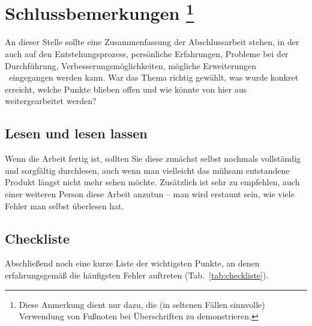 \chapter[Schlussbemerkungen]%
        {Schlussbemerkungen%
        \protect\footnote{Diese Anmerkung dient nur dazu, die (in seltenen Fällen sinnvolle)
				Verwendung von Fußnoten bei Überschriften zu demonstrieren.}}%
\label{cha:Schluss}

An dieser Stelle sollte eine Zusammenfassung der Abschlussarbeit
stehen, in der auch auf den Entstehungsprozess, persönliche
Erfahrungen, Probleme bei der Durchführung,
Verbesserungsmöglichkeiten, mögliche %
Erweiterungen \usw\ eingegangen werden kann. War das Thema richtig
gewählt, was wurde konkret erreicht, welche Punkte blieben offen
und wie könnte von hier aus weitergearbeitet werden?


\section{Lesen und lesen lassen}

Wenn die Arbeit fertig ist, sollten Sie diese zunächst selbst nochmals vollständig und sorgfältig durchlesen, auch wenn man vielleicht das mühsam entstandene Produkt längst nicht mehr sehen möchte. Zusätzlich ist sehr zu empfehlen, auch einer weiteren Person diese Arbeit anzutun -- man wird erstaunt sein, wie viele Fehler man selbst überlesen hat. 



\section{Checkliste}

Abschließend noch eine kurze Liste der wichtigsten Punkte, an denen erfahrungsgemäß die häufigsten Fehler auftreten (Tab.\ \ref{tab:checkliste}).


